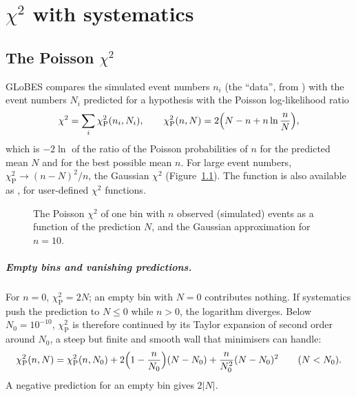\chapter{\texorpdfstring{$\chi^2$}{chi2} with systematics}\label{ch:chi2}

\section{The Poisson \texorpdfstring{$\chi^2$}{chi2}}\label{sec:poisson}

GLoBES compares the simulated event numbers $n_i$ (the ``data'', from
) with the event numbers $N_i$ predicted for a hypothesis with
the Poisson log-likelihood ratio
\begin{equation}
\chi^2 = \sum_i \chi^2_\text{P}(n_i, N_i),\qquad
\chi^2_\text{P}(n, N) = 2\Bigl(N - n + n\ln\frac{n}{N}\Bigr),
\label{eq:poisson}
\end{equation}
which is $-2\ln$ of the ratio of the Poisson probabilities of $n$ for the
predicted mean $N$ and for the best possible mean $n$. For large event numbers,
$\chi^2_\text{P}\to(n-N)^2/n$, the Gaussian $\chi^2$
(Figure~\ref{fig:poisson}). The function is also available as
, for user-defined $\chi^2$ functions.

\begin{figure}[t]
\centering
{}
\caption{The Poisson $\chi^2$ of one bin with $n$ observed (simulated) events
as a function of the prediction $N$, and the Gaussian approximation for
$n=10$.}
\label{fig:poisson}
\end{figure}

\paragraph{Empty bins and vanishing predictions.} For $n=0$,
$\chi^2_\text{P}=2N$; an empty bin with $N=0$ contributes nothing. If
systematics push the prediction to $N\le0$ while $n>0$, the logarithm diverges.
Below $N_0=10^{-10}$, $\chi^2_\text{P}$ is therefore continued by its Taylor
expansion of second order around $N_0$, a steep but finite and smooth wall that
minimisers can handle:
\begin{equation}
\chi^2_\text{P}(n, N) = \chi^2_\text{P}(n,N_0) + 2\Bigl(1-\frac{n}{N_0}\Bigr)(N-N_0)
  + \frac{n}{N_0^2}(N-N_0)^2 \qquad (N<N_0).
\end{equation}
A negative prediction for an empty bin gives $2|N|$.


